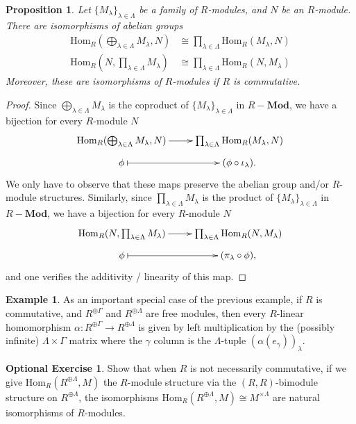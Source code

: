 \documentclass{amsart}[12pt]
\newcommand{\Hom}{\mathrm{Hom}}
\numberwithin{equation}{section}
\theoremstyle{plain} %
\newtheorem{prop}[equation]{Proposition}
\theoremstyle{definition}
\newtheorem{ex}[equation]{Example}
\newtheorem{exer}[equation]{Optional Exercise}
\theoremstyle{remark}
\newcommand{\Mod}[1]{#1-\mathbf{Mod}}
\begin{document}
\begin{prop}
Let $\{M_\lambda\}_{\lambda\in \Lambda}$ be a family of $R$-modules, and $N$ be an  $R$-module.
There are isomorphisms of abelian groups
\[\begin{aligned} \Hom_R(\bigoplus_{\lambda\in \Lambda} M_\lambda, N) &\cong \prod_{\lambda\in \Lambda} \Hom_R(M_\lambda,N)\\
\Hom_R(N,\prod_{\lambda\in \Lambda} M_\lambda) &\cong \prod_{\lambda\in \Lambda} \Hom_R(N,M_\lambda)\end{aligned}\]
Moreover, these are isomorphisms of $R$-modules if $R$ is commutative.
\end{prop}
\begin{proof}
Since $\bigoplus_{\lambda\in \Lambda} M_\lambda$ is the coproduct of $\{M_\lambda\}_{\lambda\in \Lambda}$ in $\Mod{R}$, we have a bijection for every $R$-module $N$
\[\xymatrix@R=.6em { \Hom_R(\bigoplus_{\lambda\in \Lambda} M_\lambda, N) \ar[r] & \prod_{\lambda\in \Lambda} \Hom_R(M_\lambda,N) \\
\phi \ar@{|->}[r] &(\phi \circ \iota_\lambda).}\]
We only have to observe that these maps preserve the abelian group and/or $R$-module structures.
Similarly, since $\prod_{\lambda\in \Lambda} M_\lambda$ is the product of $\{M_\lambda\}_{\lambda\in \Lambda}$ in $\Mod{R}$, we have a bijection for every $R$-module $N$
\[\xymatrix@R=.6em { \Hom_R(N,\prod_{\lambda\in \Lambda} M_\lambda) \ar[r] & \prod_{\lambda\in \Lambda} \Hom_R(N,M_\lambda) \\
\phi \ar@{|->}[r] &(\pi_\lambda \circ \phi),}\]
and one verifies the additivity / linearity of this map.
\end{proof}


\begin{ex} As an important special case of the previous example, if $R$ is commutative, and $R^{\oplus\Gamma}$ and $R^{\oplus\Lambda}$ are free modules, then every $R$-linear homomorphism $\alpha:R^{\oplus\Gamma} \to R^{\oplus\Lambda}$ is given by left multiplication by the (possibly infinite) $\Lambda \times \Gamma$ matrix where the $\gamma$ column is the $\Lambda$-tuple $(\alpha(e_\gamma))_\lambda$.
\end{ex}


\begin{exer} Show that when $R$ is not necessarily commutative, if we give $\Hom_R(R^{\oplus\Lambda},M)$ the $R$-module structure via the $(R,R)$-bimodule structure on $R^{\oplus\Lambda}$, the isomorphisms $\Hom_R(R^{\oplus\Lambda},M)\cong M^{\times \Lambda}$ are natural isomorphisms of $R$-modules.
\end{exer}
\end{document}
